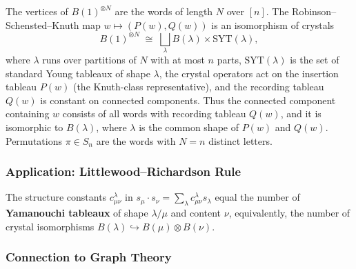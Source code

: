 \begin{theorem}
The vertices of $B(1)^{\otimes N}$ are the words of length $N$ over
$[n]$. The Robinson--Schensted--Knuth map $w \mapsto (P(w), Q(w))$ is
an isomorphism of crystals
\[
  B(1)^{\otimes N} \;\cong\; \bigsqcup_{\lambda} B(\lambda) \times \mathrm{SYT}(\lambda),
\]
where $\lambda$ runs over partitions of $N$ with at most $n$ parts,
$\mathrm{SYT}(\lambda)$ is the set of standard Young tableaux of shape
$\lambda$, the crystal operators act on the insertion tableau $P(w)$
(the Knuth-class representative), and the recording tableau $Q(w)$ is
constant on connected components. Thus the connected component
containing $w$ consists of all words with recording tableau $Q(w)$, and
it is isomorphic to $B(\lambda)$, where $\lambda$ is the common shape of
$P(w)$ and $Q(w)$. Permutations $\pi \in S_n$ are the words with
$N = n$ distinct letters.
\end{theorem}

\subsubsection{Application: Littlewood--Richardson Rule}

\begin{theorem}
The structure constants $c_{\mu \nu}^\lambda$ in
$s_\mu \cdot s_\nu = \sum_\lambda c_{\mu\nu}^\lambda s_\lambda$
equal the number of \textbf{Yamanouchi tableaux} of shape $\lambda / \mu$
and content $\nu$, equivalently, the number of crystal isomorphisms
$B(\lambda) \hookrightarrow B(\mu) \otimes B(\nu)$.
\end{theorem}

\subsubsection{Connection to Graph Theory}

